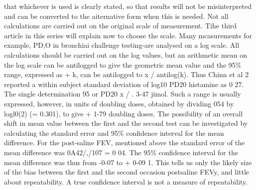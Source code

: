 \documentclass{article}
\begin{document}
that whichever is used is clearly stated, so that
results will not be misinterpreted and can be
converted to the aiternative form when this is
needed.
\newpage
Not all calculations are carried out on the original scale of measurement. Tihe third
article in this series will explain now to choose
the scale. Many mcasurements for example,
PD,O in bronchiai challenge testing-are
analysed on a log scale. All calculations should
be carried out on the log values, but an
arithmetic mean on the log scale can be
antilogged to give the geometric mean value
and the 95\% range, expressed as + k, can be
antilogged to x / antilog(k). Thus Chinn et
al 2 reported a within subject standard deviation
of log10 PD20 histamine as 0 27. The
single determination 95%
or PD20 x / . 3-47 jimol. Such a range
is usually expressed, however, in units of
doubling doses, obtained by dividing 054 by
logl0(2) (= 0.301), to give + 1-79 doubling
doses.
The possibility of an overall shift in mean
value between the first and the second test can
be investigated by calculating the standard
error and 95\% confidence interval for the
mean difference. For the post-saline FEV,
mentioned above the standard error of the
mean difference was 0A42/,/107 = 0 04. The
95\% confidence interval for the mean difference
was thus from -0-07 to + 0-09 1.
This tells us only the likely size of the bias
between the first and the second occasion postsaline
FEVy, and little about repeatability. A
true confidence interval is not a measure of
repeatability.
\end{document}
